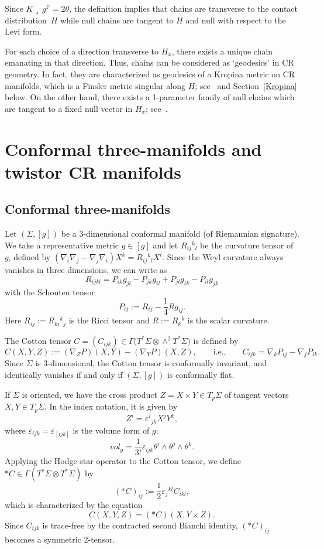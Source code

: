 \documentclass[pdftex]{sigma}
\newcommand\e{\varepsilon}
\renewcommand\th{\theta}
\numberwithin{equation}{section}
\begin{document}
Since $K\lrcorner\, g^{\mathrm{F}}=2\th$, the definition implies that chains are transverse to the contact distribution~$H$ while null chains are tangent to $H$ and null with respect to the Levi form.

For each choice of a direction transverse to $H_x$, there exists a unique chain emanating in that direction. Thus, chains can be considered as `geodesics' in CR geometry. In fact, they are characterized as geodesics of a Kropina metric on CR manifolds, which is a Finsler metric singular along $H$; see~\cite{CMMM} and Section~\ref{Kropina} below. On the other hand, there exists a 1-parameter family of null chains which are tangent to a fixed null vector in $H_x$; see~\cite{Koch}.

\section{Conformal three-manifolds and twistor CR manifolds}\label{conformal-three}

\subsection{Conformal three-manifolds}
Let $(\Sigma, [g])$ be a $3$-dimensional conformal manifold (of Riemannian signature). We take a representative metric $g\in[g]$ and let $R_{ij}{}^k{}_l$ be the curvature tensor of $g$, defined by $(\nabla_i\nabla_j-\nabla_j\nabla_i)X^k=R_{ij}{}^k{}_lX^l$. Since the Weyl curvature always vanishes in three dimensions, we can write as
\begin{equation}\label{curvature-tensor}
R_{ijkl}=P_{ik}g_{jl}-P_{jk}g_{il}+P_{jl}g_{ik}-P_{il}g_{jk}
\end{equation}
with the Schouten tensor
\[
P_{ij}:=R_{ij}-\frac{1}{4}Rg_{ij}.
\]
Here $R_{ij}:=R_{ki}{}^k{}_j$ is the Ricci tensor and $R:=R_k{}^k$ is the scalar curvature.

The Cotton tensor $C=(C_{ijk})\in \Gamma\bigl(T^*\Sigma\otimes \wedge^2 T^*\Sigma\bigr)$ is defined by
\[
C(X, Y, Z):=(\nabla_Z P)(X, Y)-(\nabla_Y P)(X, Z), \qquad \text{i.e.,}\qquad
C_{ijk}=\nabla_k P_{ij}-\nabla_j P_{ik}.
\]
Since $\Sigma$ is 3-dimensional, the Cotton tensor is conformally invariant, and identically vanishes if and only if $(\Sigma, [g])$ is conformally flat.

If $\Sigma$ is oriented, we have the cross product $Z=X\times Y\in T_p\Sigma$ of tangent vectors $X, Y\in T_p\Sigma$. In the index notation, it is given by
\[
Z^i=\e^i{}_{jk}X^j Y^k,
\]
where $\e_{ijk}=\e_{[ijk]}$ is the volume form of $g$:
\[
vol_g=\frac{1}{3!}\e_{ijk}\th^i\wedge \th^j\wedge \th^k.
\]
Applying the Hodge star operator to the Cotton tensor, we define $*C\in\Gamma(T^*\Sigma\otimes T^*\Sigma)$ by
\[
(*C)_{ij}:=\frac{1}{2}\varepsilon_j{}^{kl}C_{ikl},
\]
which is characterized by the equation
\[
C(X, Y, Z)=(*C)(X, Y\times Z).
\]
Since $C_{ijk}$ is trace-free by the contracted second Bianchi identity, $(*C)_{ij}$ becomes a symmetric 2-tensor.
\end{document}
